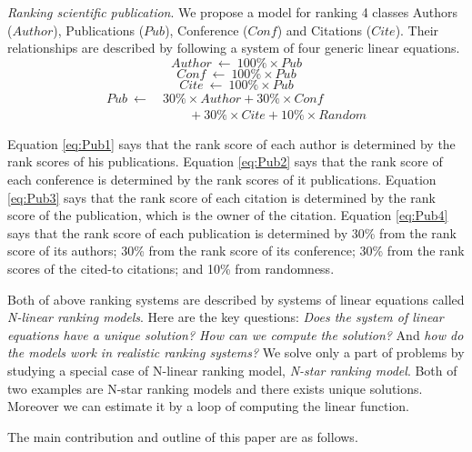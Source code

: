 \documentclass[10pt,leqno,twoside]{article}
\begin{document}
\textit{Ranking scientific publication}. We propose a model for ranking 4 classes Authors ($Author$), Publications ($Pub$), Conference ($Conf$) and Citations ($Cite$). Their relationships are described by following a system of four generic linear equations.
{\small
\begin{equation}\label{eq:Pub1}
Author ~\longleftarrow~ 100\% \times Pub
\end{equation}
\begin{equation}\label{eq:Pub2}
Conf ~\longleftarrow~ 100\% \times Pub
\end{equation}
\begin{equation}\label{eq:Pub3}
Cite ~\longleftarrow~ 100\% \times Pub
\end{equation}
\begin{equation}\label{eq:Pub4}
\begin{split}
Pub ~\longleftarrow~ &30\% \times Author +  30\% \times Conf\\ 
&\qquad +  30\% \times Cite+  10\% \times Random
\end{split}
\end{equation}
}

Equation \ref{eq:Pub1} says that the rank score of each author is determined by the rank scores of his publications. Equation \ref{eq:Pub2} says that the rank score of each conference is determined by the rank scores of it publications. Equation \ref{eq:Pub3} says that the rank score of each citation is determined by the rank score of the publication, which is the owner of the citation. Equation \ref{eq:Pub4} says that the rank score of each publication is determined by 30\% from the rank score of its authors; 30\% from the rank score of its conference; 30\% from the rank scores of the cited-to citations; and 10\% from randomness.

Both of above ranking systems are described by systems of linear equations called \textit{N-linear ranking models}. Here are the key questions: \textit{Does the system of linear equations have a unique solution? How can we compute the solution?} And \textit{how do the models work in realistic ranking systems?} We solve only a part of problems by studying a special case of N-linear ranking model, \textit{N-star ranking model}. Both of two examples are N-star ranking models  and there exists unique solutions. Moreover we can estimate it by a loop of computing the linear function.


The main contribution and outline of this paper are as follows.
\end{document}
